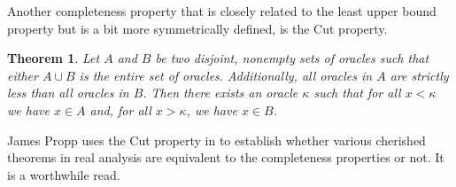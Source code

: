 \documentclass[12pt]{article}
\newtheorem{theorem}{Theorem}[subsection]
\begin{document}
Another completeness property that is closely related to the least upper bound property but is a bit more symmetrically defined, is the Cut property. 

\begin{theorem}\label{th:cut}
    Let $A$ and $B$ be two disjoint, nonempty sets of oracles such that either $A \cup B$ is the entire set of oracles.  Additionally, all oracles in $A$ are strictly less than all oracles in $B$. Then there exists an oracle $\kappa$ such that for all $x < \kappa$ we have $x \in A$ and, for all $x > \kappa$, we have $x \in B$.
\end{theorem}

James Propp uses the Cut property in \cite{propp} to establish whether various cherished theorems in real analysis are equivalent to the completeness properties or not. It is a worthwhile read. 
\end{document}

